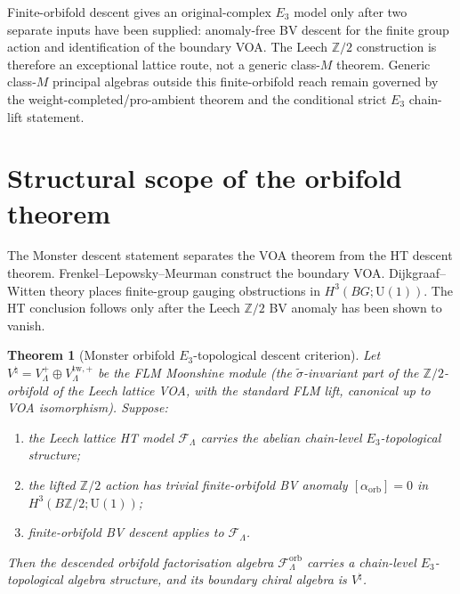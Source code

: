 \documentclass[11pt]{amsart}
\newtheorem{theorem}{Theorem}[section]
\theoremstyle{definition}
\theoremstyle{remark}
\providecommand{\Z}{\mathbb{Z}}
\providecommand{\cF}{\mathcal{F}}
\begin{document}
Finite-orbifold descent gives an original-complex $E_3$ model only
after two separate inputs have been supplied: anomaly-free BV descent
for the finite group action and identification of the boundary VOA.
The Leech $\Z/2$ construction is therefore an exceptional lattice
route, not a generic class-$M$ theorem. Generic class-$M$ principal
algebras outside this finite-orbifold reach remain governed by the
weight-completed/pro-ambient theorem and the conditional strict
$E_3$ chain-lift statement.

\section{Structural scope of the orbifold theorem}

The Monster descent statement separates the VOA theorem from the HT
descent theorem. Frenkel--Lepowsky--Meurman construct the boundary
VOA. Dijkgraaf--Witten theory places finite-group gauging obstructions
in $H^3(BG;\mathrm{U}(1))$. The HT conclusion follows only after the
Leech $\Z/2$ BV anomaly has been shown to vanish.

\begin{theorem}[Monster orbifold $E_3$-topological descent criterion]
\label{thm:monster-e3-standalone}
Let $V^\natural = V_\Lambda^+ \oplus V_\Lambda^{\mathrm{tw},+}$ be
the FLM Moonshine module (the $\widetilde\sigma$-invariant part of
the $\Z/2$-orbifold of the Leech lattice VOA, with the standard FLM
lift, canonical up to VOA isomorphism).  Suppose:
\begin{enumerate}[label=\textup{(\roman*)}, nosep]
\item the Leech lattice HT model $\cF_\Lambda$ carries the abelian
chain-level $E_3$-topological structure;
\item the lifted $\Z/2$ action has trivial finite-orbifold BV anomaly
$[\alpha_{\mathrm{orb}}]=0$ in
$H^3(B\Z/2;\mathrm{U}(1))$;
\item finite-orbifold BV descent applies to $\cF_\Lambda$.
\end{enumerate}
Then the descended orbifold factorisation algebra
$\cF_\Lambda^{\mathrm{orb}}$ carries a chain-level
$E_3$-topological algebra structure, and its boundary chiral algebra is
$V^\natural$.
\end{theorem}
\end{document}
